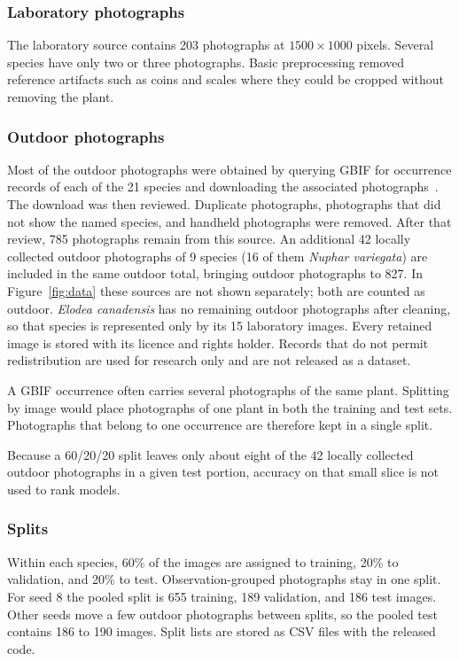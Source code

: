 \documentclass[final,3p,times,twocolumn]{elsarticle}
\begin{document}
\subsubsection{Laboratory photographs}
The laboratory source contains 203 photographs at \(1500\times 1000\) pixels. Several species have only two or three photographs. Basic preprocessing removed reference artifacts such as coins and scales where they could be cropped without removing the plant.

\subsubsection{Outdoor photographs}
\label{subsec:webdata}

Most of the outdoor photographs were obtained by querying GBIF for occurrence records of each of the 21 species and downloading the associated photographs~\citep{gbif2026}. The download was then reviewed. Duplicate photographs, photographs that did not show the named species, and handheld photographs were removed. After that review, 785 photographs remain from this source. An additional 42 locally collected outdoor photographs of 9 species (16 of them \emph{Nuphar variegata}) are included in the same outdoor total, bringing outdoor photographs to 827. In Figure~\ref{fig:data} these sources are not shown separately; both are counted as outdoor. \emph{Elodea canadensis} has no remaining outdoor photographs after cleaning, so that species is represented only by its 15 laboratory images. Every retained image is stored with its licence and rights holder. Records that do not permit redistribution are used for research only and are not released as a dataset.

A GBIF occurrence often carries several photographs of the same plant. Splitting by image would place photographs of one plant in both the training and test sets. Photographs that belong to one occurrence are therefore kept in a single split.

Because a 60/20/20 split leaves only about eight of the 42 locally collected outdoor photographs in a given test portion, accuracy on that small slice is not used to rank models.

\subsubsection{Splits}
Within each species, 60\% of the images are assigned to training, 20\% to validation, and 20\% to test. Observation-grouped photographs stay in one split. For seed 8 the pooled split is 655 training, 189 validation, and 186 test images. Other seeds move a few outdoor photographs between splits, so the pooled test contains 186 to 190 images. Split lists are stored as CSV files with the released code.
\end{document}
